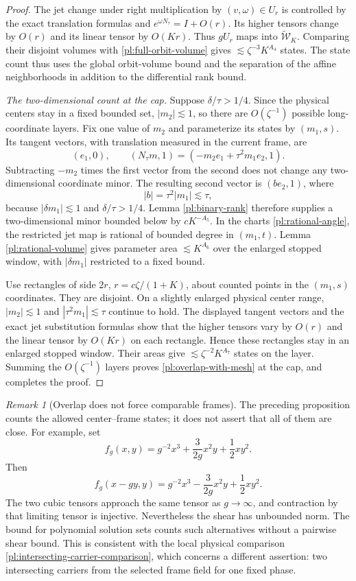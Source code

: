 \documentclass[11pt]{amsart}
\theoremstyle{definition}
\theoremstyle{remark}
\newtheorem{remark}[theorem]{Remark}
\numberwithin{equation}{section}
\begin{document}
\begin{proof}
The jet change under right multiplication by $(v,\omega)\in U_r$ is controlled by the exact translation formulas and $e^{\omega N_\tau}=I+O(r)$. Its higher tensors change by $O(r)$ and its linear tensor by $O(Kr)$. Thus $gU_r$ maps into $\widetilde{\mathcal W}_K$. Comparing their disjoint volumes with \eqref{pl:full-orbit-volume} gives $\lesssim\zeta^{-3}K^{A_4}$ states. The state count thus uses the global orbit-volume bound and the separation of the affine neighborhoods in addition to the differential rank bound.

\emph{The two-dimensional count at the cap.} Suppose $\delta/\tau>1/4$. Since the physical centers stay in a fixed bounded set, $|m_2|\lesssim1$, so there are $O(\zeta^{-1})$ possible long-coordinate layers. Fix one value of $m_2$ and parameterize its states by $(m_1,s)$. Its tangent vectors, with translation measured in the current frame, are
\[
(e_1,0),\qquad (N_\tau m,1)=(-m_2e_1+\tau^2m_1e_2,1).
\]
Subtracting $-m_2$ times the first vector from the second does not change any two-dimensional coordinate minor. The resulting second vector is $(be_2,1)$, where
\[
|b|=\tau^2|m_1|\lesssim\tau,
\]
because $|\delta m_1|\lesssim1$ and $\delta/\tau>1/4$. Lemma \ref{pl:binary-rank} therefore supplies a two-dimensional minor bounded below by $cK^{-A_5}$. In the charts \eqref{pl:rational-angle}, the restricted jet map is rational of bounded degree in $(m_1,t)$. Lemma \ref{pl:rational-volume} gives parameter area $\lesssim K^{A_6}$ over the enlarged stopped window, with $|\delta m_1|$ restricted to a fixed bound.

Use rectangles of side $2r$, $r=c\zeta/(1+K)$, about counted points in the $(m_1,s)$ coordinates. They are disjoint. On a slightly enlarged physical center range, $|m_2|\lesssim1$ and $|\tau^2m_1|\lesssim\tau$ continue to hold. The displayed tangent vectors and the exact jet substitution formulas show that the higher tensors vary by $O(r)$ and the linear tensor by $O(Kr)$ on each rectangle. Hence these rectangles stay in an enlarged stopped window. Their areas give $\lesssim\zeta^{-2}K^{A_7}$ states on the layer. Summing the $O(\zeta^{-1})$ layers proves \eqref{pl:overlap-with-mesh} at the cap, and completes the proof.
\end{proof}

\begin{remark}[Overlap does not force comparable frames]\label{pl:large-shear}
The preceding proposition counts the allowed center--frame states; it does not assert that all of them are close. For example, set
\[
f_g(x,y)=g^{-2}x^3+\frac{3}{2g}x^2y+\frac12xy^2.
\]
Then
\[
f_g(x-gy,y)=g^{-2}x^3-\frac{3}{2g}x^2y+\frac12xy^2.
\]
The two cubic tensors approach the same tensor as $g\to\infty$, and contraction by that limiting tensor is injective. Nevertheless the shear has unbounded norm. The bound for polynomial solution sets counts such alternatives without a pairwise shear bound. This is consistent with the local physical comparison \eqref{pl:intersecting-carrier-comparison}, which concerns a different assertion: two intersecting carriers from the selected frame field for one fixed phase.
\end{remark}
\end{document}
